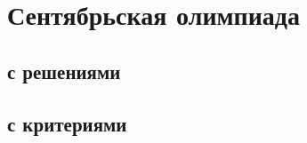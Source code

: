 
%     
%     
%     
%     
%     



\begingroup
\providecommand\olympiadsolution[1]{#1}
\providecommand\olympiadcriteria[1]{#1}

\section*{Сентябрьская олимпиада}

\olympiadsolution{\subsection*{с решениями}}
\olympiadcriteria{\subsection*{с критериями}}

